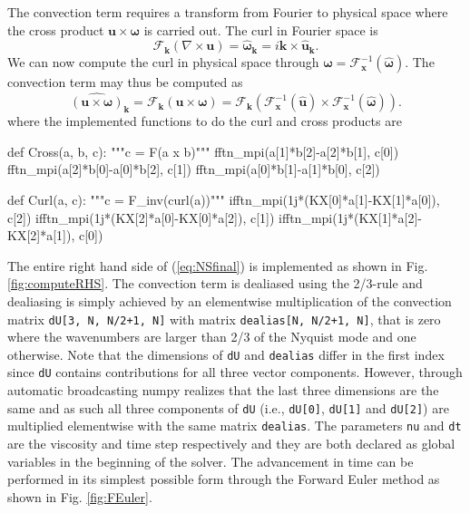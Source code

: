 \documentclass[11pt, oneside]{article}
\newcommand{\inpyth}{\lstinline[style=pythonstyle, basicstyle=\ttfamily]} %[]%
\begin{document}
The convection term requires a transform from Fourier to physical space where the cross product $\bm{u} \times \bm{\omega}$ is carried out. The curl in Fourier space is
\begin{equation}
\mathcal{F}_{\bm{k}}(\nabla \times \bm{u}) = \hat{\bm{\omega}}_{\bm{k}} = i \bm{k} \times \hat{\bm{u}}_{\bm{k}}.
\end{equation}
We can now compute the curl in physical space through $\bm{\omega} = \mathcal{F}_{\bm{x}}^{-1}(\hat{\bm{\omega}})$. The convection term may thus be computed as
\begin{equation}
\widehat{( \bm{u} \times \bm{\omega})}_{\bm{k}} = \mathcal{F}_{\bm{k}}(\bm{u} \times \bm{\omega}) = \mathcal{F}_{\bm{k}} (\mathcal{F}^{-1}_{\bm{x}}(\hat{\bm{u}}) \times \mathcal{F}^{-1}_{\bm{x}}(\hat{\bm{\omega}})).
\end{equation}
where the implemented functions to do the curl and cross products are
\begin{python}
def Cross(a, b, c):
    """c = F(a x b)"""
    fftn_mpi(a[1]*b[2]-a[2]*b[1], c[0])
    fftn_mpi(a[2]*b[0]-a[0]*b[2], c[1])
    fftn_mpi(a[0]*b[1]-a[1]*b[0], c[2])

def Curl(a, c):
    """c = F_inv(curl(a))"""
    ifftn_mpi(1j*(KX[0]*a[1]-KX[1]*a[0]), c[2])
    ifftn_mpi(1j*(KX[2]*a[0]-KX[0]*a[2]), c[1])
    ifftn_mpi(1j*(KX[1]*a[2]-KX[2]*a[1]), c[0])

\end{python}
The entire right hand side of (\ref{eq:NSfinal}) is implemented as shown in Fig. \ref{fig:computeRHS}. The convection term is dealiased using the 2/3-rule and dealiasing is simply achieved by an elementwise multiplication of the convection matrix \inpyth{dU[3, N, N/2+1, N]} with matrix \inpyth{dealias[N, N/2+1, N]}, that is zero where the wavenumbers are larger than 2/3 of the Nyquist mode and one otherwise. Note that the dimensions of \inpyth{dU} and \inpyth{dealias} differ in the first index since \inpyth{dU} contains contributions for all three vector components. However, through automatic broadcasting numpy realizes that the last three dimensions are the same and as such all three components of \inpyth{dU} (i.e.,  \inpyth{dU[0]}, \inpyth{dU[1]} and  \inpyth{dU[2]}) are multiplied elementwise with the same matrix \inpyth{dealias}. The parameters \inpyth{nu} and \inpyth{dt} are the viscosity and time step respectively and they are both declared as global variables in the beginning of the solver. The advancement in time can be performed in its simplest possible form through the Forward Euler method as shown in Fig. \ref{fig:FEuler}.
\end{document}
